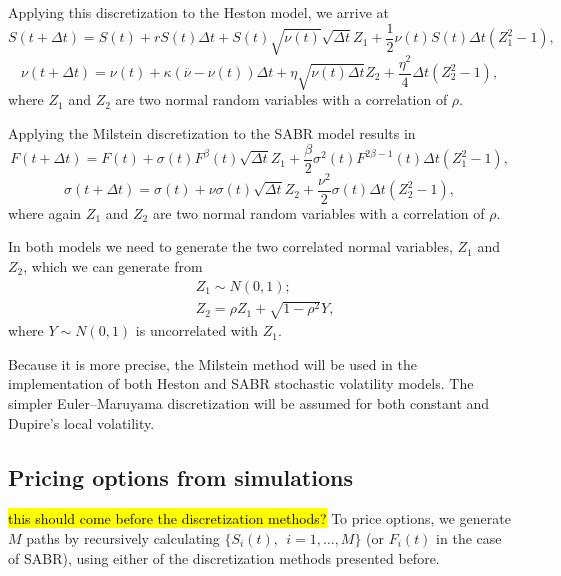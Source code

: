 Applying this discretization to the Heston model, we arrive at
\begin{equation}
S(t+\Delta t)=S(t)+rS(t)\Delta t+S(t)\sqrt{\nu(t)}\sqrt{\Delta t}Z_1+\frac{1}{2}\nu(t)S(t)\Delta t(Z_1^2-1),
\end{equation}
\begin{equation}
\nu(t+\Delta t)=\nu(t)+\kappa(\overline{\nu}-\nu(t))\Delta t+\eta\sqrt{\nu(t)\Delta t}Z_2+\frac{\eta^2}{4}\Delta t(Z_2^2-1),
\end{equation}
\noindent where $Z_1$ and $Z_2$ are two normal random variables with a correlation of $\rho$.


Applying the Milstein discretization to the SABR model results in
\begin{equation}
F(t+\Delta t)=F(t)+\sigma(t)F^\beta(t)\sqrt{\Delta t}Z_1+\frac{\beta}{2}\sigma^2(t)F^{2\beta-1}(t)\Delta t(Z_1^2-1),
\end{equation}
\begin{equation}
\sigma(t+\Delta t)=\sigma(t)+\nu\sigma(t)\sqrt{\Delta t}Z_2+\frac{\nu^2}{2}\sigma(t)\Delta t(Z_2^2-1),
\end{equation}
\noindent where again $Z_1$ and $Z_2$ are two normal random variables with a correlation of $\rho$.

In both models we need to generate the two correlated normal variables, $Z_1$ and $Z_2$, which we can generate from
\begin{equation}\label{normcorr}
\begin{split}
&Z_1\sim N(0,1);\\
&Z_2=\rho Z_1+\sqrt{1-\rho^2}Y,
\end{split}
\end{equation}
\noindent where $Y\sim N(0,1)$ is uncorrelated with $Z_1$.

Because it is more precise, the Milstein method will be used in the implementation of both Heston and SABR stochastic volatility models. The simpler Euler–Maruyama discretization will be assumed for both constant and Dupire's local volatility.


\subsection{Pricing options from simulations}
\hl{this should come before the discretization methods?}
To price options, we generate $M$ paths by recursively calculating $\{S_i(t),\ \ i=1,\ldots,M\}$ (or $F_i(t)$ in the case of SABR), using either of the discretization methods presented before.

